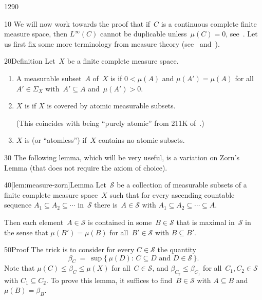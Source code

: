 \begin{parsec}{1290}%
\begin{point}{10}%
We will now work towards
the proof that
if~$C$ is a continuous complete finite measure space,
then
$L^\infty(C)$
cannot be duplicable 
unless~$\mu(C)=0$,
see~.
Let us first fix some more terminology
from measure theory (see~ and~\cite{fremlin}).
\end{point}
\begin{point}{20}{Definition}
\label{def:measure-space}
Let~$X$ be a finite complete measure space.
\begin{enumerate}
\item
A measurable subset~$A$ of~$X$
is 
if $0<\mu(A)$
and $\mu(A')=\mu(A)$ for all~$A'\in\Sigma_X$
with~$A'\subseteq A$ and~$\mu(A')>0$.

\item
$X$ is  if $X$ is covered by atomic measurable subsets.%

(This coincides with being ``purely atomic''
from 211K of~\cite{fremlin}.)
\item
$X$ is %
(or ``atomless'')
if~$X$ contains no atomic subsets.
\end{enumerate}
\spacingfix%
\end{point}%
\begin{point}{30}%
The following lemma,
which will be very useful,
is a variation on
Zorn's Lemma
(that does not require the axiom of choice).
\end{point}
\begin{point}{40}[lem:measure-zorn]{Lemma}
Let~$\mathcal{S}$
be a collection of measurable subsets of
a finite complete measure space~$X$ 
such that 
for 
every ascending countable sequence
$A_1\subseteq A_2 \subseteq \dotsb$
in~$\mathcal{S}$
there is~$A\in\mathcal{S}$
with $A_1\subseteq A_2\subseteq\dotsb \subseteq A$.

Then each element~$A\in\mathcal{S}$
is contained in some~$B\in\mathcal{S}$
that is maximal in~$\mathcal{S}$ in the sense
that $\mu(B')=\mu(B)$
for all~$B'\in\mathcal{S}$ with $B\subseteq B'$.
\begin{point}{50}{Proof}
	The trick is to consider for every $C\in\mathcal{S}$
the quantity
\begin{equation*}
	\beta_C \ = \ \sup\{\,\mu(D)\colon\, C\subseteq D
\text{ and }D\in \mathcal{S}\,\}.
\end{equation*}
Note that $\mu(C)\leq \beta_C \leq \mu(X)$
	for all~$C\in\mathcal{S}$,
	and $\beta_{C_2}\leq \beta_{C_1}$
	for all~$C_1,C_2\in\mathcal{S}$ with $C_1 \subseteq C_2$.
	To prove this lemma, it suffices to find~$B\in\mathcal{S}$
with $A\subseteq B$ and~$\mu(B)=\beta_B$.


\end{point}
\end{point}
\end{parsec}

